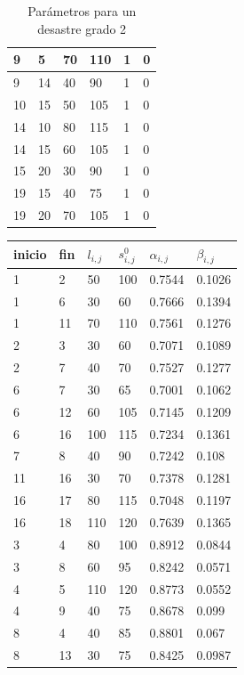 \begin{table}[H]
\begin{tabular}{|l|l|l|l|l|l|}
9 & 5 & 70 & 110 & 1 & 0 \\ \hline
9 & 14 & 40 & 90 & 1 & 0 \\ \hline
10 & 15 & 50 & 105 & 1 & 0 \\ \hline
14 & 10 & 80 & 115 & 1 & 0 \\ \hline
14 & 15 & 60 & 105 & 1 & 0 \\ \hline
15 & 20 & 30 & 90 & 1 & 0 \\ \hline
19 & 15 & 40 & 75 & 1 & 0 \\ \hline
19 & 20 & 70 & 105 & 1 & 0 \\ \hline
\end{tabular}
\caption{Parámetros para un desastre grado 2}
\label{grade2}
\end{table}

\begin{table}[H]
\centering
\begin{tabular}{|l|l|l|l|l|l|}
\hline
inicio & fin & $l_{i,j}$ & $s_{i,j}^0$ & $\alpha_{i,j}$ & $\beta_{i,j}$ \\ \hline
1 & 2 & 50 & 100 & 0.7544 & 0.1026 \\ \hline
1 & 6 & 30 & 60 & 0.7666 & 0.1394 \\ \hline
1 & 11 & 70 & 110 & 0.7561 & 0.1276 \\ \hline
2 & 3 & 30 & 60 & 0.7071 & 0.1089 \\ \hline
2 & 7 & 40 & 70 & 0.7527 & 0.1277 \\ \hline
6 & 7 & 30 & 65 & 0.7001 & 0.1062 \\ \hline
6 & 12 & 60 & 105 & 0.7145 & 0.1209 \\ \hline
6 & 16 & 100 & 115 & 0.7234 & 0.1361 \\ \hline
7 & 8 & 40 & 90 & 0.7242 & 0.108 \\ \hline
11 & 16 & 30 & 70 & 0.7378 & 0.1281 \\ \hline
16 & 17 & 80 & 115 & 0.7048 & 0.1197 \\ \hline
16 & 18 & 110 & 120 & 0.7639 & 0.1365 \\ \hline
3 & 4 & 80 & 100 & 0.8912 & 0.0844 \\ \hline
3 & 8 & 60 & 95 & 0.8242 & 0.0571 \\ \hline
4 & 5 & 110 & 120 & 0.8773 & 0.0552 \\ \hline
4 & 9 & 40 & 75 & 0.8678 & 0.099 \\ \hline
8 & 4 & 40 & 85 & 0.8801 & 0.067 \\ \hline
8 & 13 & 30 & 75 & 0.8425 & 0.0987 \\ \hline

\end{tabular}
\end{table}
